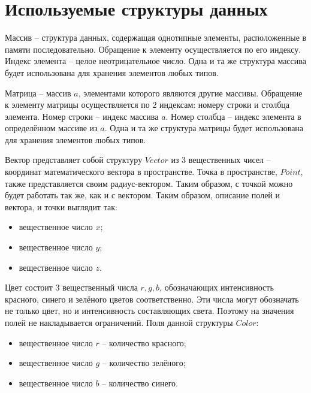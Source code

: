 \section{Используемые структуры данных} {
    Массив -- структура данных, содержащая однотипные элементы,
    расположенные в памяти последовательно.
    Обращение к элементу осуществляется по его индексу.
    Индекс элемента -- целое неотрицательное число.
    Одна и та же структура массива будет использована для хранения
    элементов любых типов.
    
    Матрица -- массив $a$, элементами которого являются другие массивы.
    Обращение к элементу матрицы осуществляется по 2 индексам:
    номеру строки и столбца элемента.
    Номер строки -- индекс массива $a$.
    Номер столбца -- индекс элемента в определённом массиве из $a$.
    Одна и та же структура матрицы будет использована для хранения
    элементов любых типов.
    
    Вектор представляет собой структуру $Vector$ из  3 вещественных чисел --
    координат математического вектора в пространстве.
    Точка в пространстве, $Point$, также представляется своим радиус-вектором.
    Таким образом, с точкой можно будет работать так же, как и с вектором.
    Таким образом, описание полей и вектора, и точки выглядит так:
    \begin{itemize}
        \item вещественное число $x$;
        \item вещественное число $y$;
        \item вещественное число $z$.
    \end{itemize}
    
    Цвет состоит 3 вещественный числа $r, g, b$, обозначающих интенсивность
    красного, синего и зелёного цветов соответственно.
    Эти числа могут обозначать не только цвет,
    но и интенсивность составляющих света.
    Поэтому на значения полей не накладывается ограничений.
    Поля данной структуры $Color$:
    \begin{itemize}
        \item вещественное число $r$ -- количество красного;
        \item вещественное число $g$ -- количество зелёного;
        \item вещественное число $b$ -- количество синего.
    \end{itemize}
    
}
